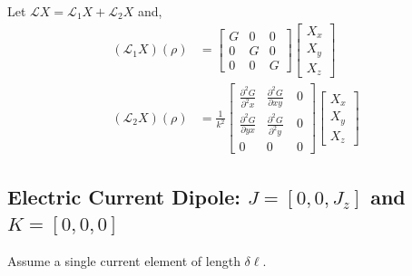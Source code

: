 \documentclass{article}
\newcommand{\0}{\varnothing}
\begin{document}
Let $\mathcal{L}X = \mathcal{L}_1 X + \mathcal{L}_2 X$ and,
\begin{align*}
    (\mathcal{L}_1 X)(\rho) &= 
    \left[ \begin{array}{ccc} G & 0 & 0 \\ 
                            0 & G & 0\\ 
                            0 & 0 & G \end{array} \right]
        \left[ \begin{array}{c} 
        X_x \\ X_y \\ X_z \end{array} \right]\\
    (\mathcal{L}_2X)(\rho)
    &= \frac{1}{k^2} \left[ \begin{array}{ccc} \frac{\partial^2 G }{\partial^2 x} & \frac{\partial^2 G }{\partial xy}\ & 0 \\ 
                            \frac{\partial^2 G}{\partial yx} & \frac{\partial^2 G}{\partial^2 y} &0\\ 
                            0 & 0 &0 \end{array} \right]
        \left[ \begin{array}{c} 
        X_x \\ X_y \\ X_z \end{array} \right]
\end{align*}

\newpage
\subsection{Electric Current Dipole: $J = [0,0,J_z]$ and $K = [0,0,0]$}

Assume a single current element of length $\delta \ell$. 
\end{document}
